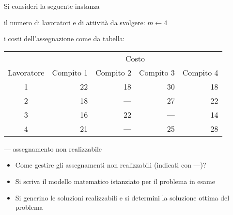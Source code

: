 \documentclass{beamer}
\begin{document}
\generatitolo

\begin{frame}{\esercizi}

Si consideri la seguente instanza

il numero di lavoratori e di attivit\`a da svolgere: $m \gets 4$

i costi dell'assegnazione
come da tabella:

\centering\small{
\begin{tabular}{crrrr} \toprule
	& \multicolumn{4}{c}{Costo}\\
\cmidrule(r){2-5}
Lavoratore & Compito 1 & Compito 2 & Compito 3 & Compito 4\\ \midrule
1 & 22 &  18 & 30 &  18 \\
2 & 18 & --- & 27 &   22 \\
3 & 16 &   22 & --- &  14 \\
4 & 21 &  --- & 25 & 28 \\ \bottomrule
\end{tabular}
}

--- assegnamento non realizzabile
\end{frame}

\begin{frame}{\esercizi}

\begin{itemize}
\item Come gestire gli assegnamenti non realizzabili (indicati con ---)?
\item Si scriva il modello matematico istanziato per il problema in esame 
\item Si generino le soluzioni realizzabili e si determini la soluzione ottima del problema
\end{itemize}
\end{frame}
\end{document}
